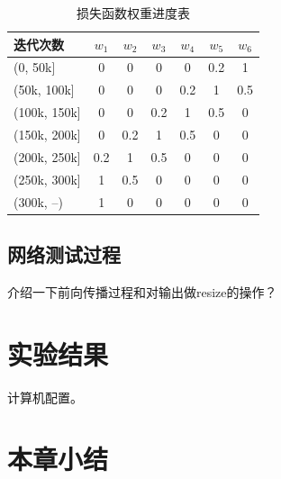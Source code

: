 \begin{table}[htbp]
	\centering
	\caption{损失函数权重进度表}
	\label{tab:4_2_loss_weight_schedule}
	\begin{scriptsize}
		\begin{tabular}{|l|cccccc|}\hline
			迭代次数  & $w_1$ & $w_2$ & $w_3$ & $w_4$ & $w_5$ & $w_6$ \\\hline
			(0, 50k]           & 0 & 0 & 0 & 0 & 0.2 & 1 \\
			(50k, 100k]     & 0 & 0 & 0 & 0.2 & 1 & 0.5 \\
			(100k, 150k]    & 0 & 0 & 0.2 & 1 & 0.5 & 0 \\
			(150k, 200k]    & 0 & 0.2 & 1 & 0.5 & 0 & 0 \\
			(200k, 250k]    & 0.2 & 1 & 0.5 & 0 & 0 & 0  \\
			(250k, 300k]    & 1 & 0.5 & 0 & 0 & 0 & 0  \\
			(300k, --)          & 1 & 0 & 0 & 0 & 0 & 0 \\\hline
		\end{tabular}
	\end{scriptsize}
\end{table}


\subsection{网络测试过程}
介绍一下前向传播过程和对输出做resize的操作？

\section{实验结果}
计算机配置。

\section{本章小结}

